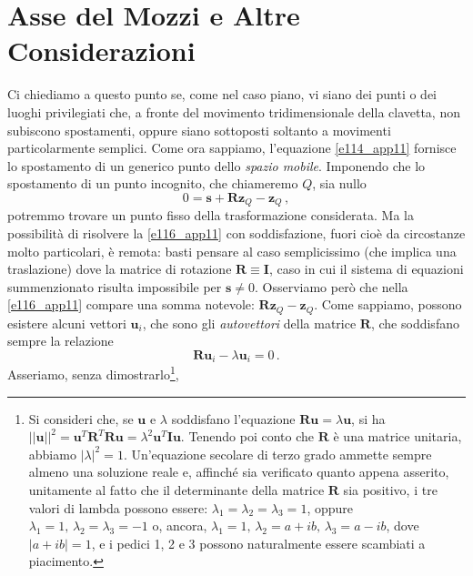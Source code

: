 \section{Asse del Mozzi e Altre Considerazioni}
\noindent Ci chiediamo a questo punto se, come nel caso piano, vi siano dei punti
o dei luoghi privilegiati che,
a fronte del movimento tridimensionale della clavetta,
non subiscono spostamenti, oppure siano sottoposti
soltanto a movimenti particolarmente semplici.
Come ora sappiamo, l'equazione \ref{e114_app11} fornisce lo spostamento di un
generico punto dello {\em spazio mobile}.
Imponendo che lo spostamento di un punto incognito,
che chiameremo
$Q$, sia nullo
\begin{equation}
0=
{{\bm s}}+
{\bm R}{\bm z}_{\scriptscriptstyle{Q}}-{\bm z}_{\scriptscriptstyle{Q}}\,,
\label{e116_app11}
\end{equation}
\noindent potremmo trovare un punto fisso della trasformazione considerata.
Ma la possibilit\`a di risolvere la \ref{e116_app11} con soddisfazione,
fuori cio\`e da circostanze molto particolari, \`e remota: basti pensare al
caso semplicissimo (che implica una traslazione) dove la matrice di
rotazione $\bm R\equiv \bm I$, caso in cui il sistema di equazioni
summenzionato risulta impossibile per
${{\bm s}}\ne0$.
Osserviamo per\`o che nella \ref{e116_app11} compare una somma notevole:
$ {\bm R}{\bm z}_{\scriptscriptstyle{Q}}-{\bm z}_{\scriptscriptstyle{Q}}$.
Come sappiamo, possono esistere alcuni vettori ${\bm u}_i$, che sono
gli {\em autovettori} della
matrice $\bm R$, che soddisfano sempre la relazione 
\begin{equation}
{\bm R}{\bm u}_i-\lambda{\bm u}_i=0\,.
\label{e117_app11}
\end{equation}
\noindent Asseriamo, senza dimostrarlo\footnote
{
Si consideri che, se $\bm u$ e $\lambda$ soddisfano l'equazione
${\bm R}{\bm u}= \lambda {\bm u}$, si ha 
$|| {\bm u}||^2 = {\bm u}^T{\bm R}^T{\bm R}{\bm u}= \lambda^2 {\bm u}^T{\bm I}{\bm u}$.
Tenendo poi conto che $\bm R$ \`e una matrice unitaria,
abbiamo $|\lambda|^2=1$. Un'equazione secolare di terzo grado ammette
sempre almeno una soluzione reale e, affinch\'e sia verificato quanto 
appena asserito, unitamente al fatto che il determinante della
matrice ${\bm R}$ sia positivo, i tre valori di lambda possono essere:
$\lambda_1=\lambda_2=\lambda_3=1$, oppure
$\lambda_1=1,\, \lambda_2=\lambda_3=-1$ o,
ancora, $\lambda_1=1,\, \lambda_2=a+ib,\,\lambda_3=a-ib$, dove $|a+ib|=1$,
e i pedici 1, 2 e 3 possono naturalmente essere scambiati a piacimento.
},
